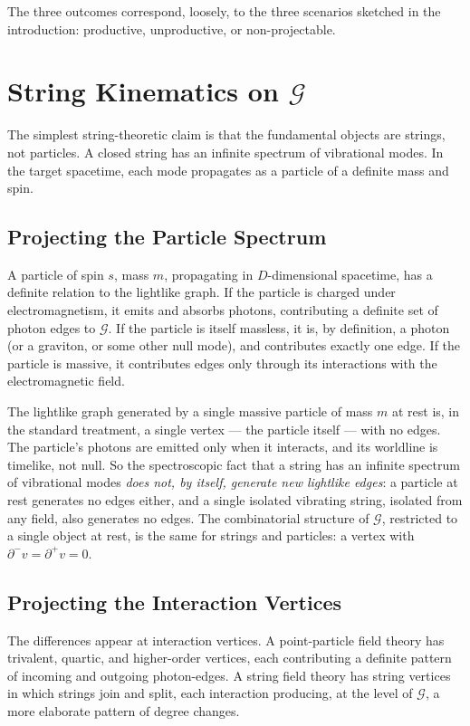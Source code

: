 \documentclass[11pt]{article}
\begin{document}
The three outcomes correspond, loosely, to the three scenarios sketched in the introduction: productive, unproductive, or non-projectable.

\section{String Kinematics on $\mathcal{G}$}

The simplest string-theoretic claim is that the fundamental objects are strings, not particles. A closed string has an infinite spectrum of vibrational modes. In the target spacetime, each mode propagates as a particle of a definite mass and spin.

\subsection{Projecting the Particle Spectrum}

A particle of spin $s$, mass $m$, propagating in $D$-dimensional spacetime, has a definite relation to the lightlike graph. If the particle is charged under electromagnetism, it emits and absorbs photons, contributing a definite set of photon edges to $\mathcal{G}$. If the particle is itself massless, it is, by definition, a photon (or a graviton, or some other null mode), and contributes exactly one edge. If the particle is massive, it contributes edges only through its interactions with the electromagnetic field.

The lightlike graph generated by a single massive particle of mass $m$ at rest is, in the standard treatment, a single vertex --- the particle itself --- with no edges. The particle's photons are emitted only when it interacts, and its worldline is timelike, not null. So the spectroscopic fact that a string has an infinite spectrum of vibrational modes \emph{does not, by itself, generate new lightlike edges}: a particle at rest generates no edges either, and a single isolated vibrating string, isolated from any field, also generates no edges. The combinatorial structure of $\mathcal{G}$, restricted to a single object at rest, is the same for strings and particles: a vertex with $\partial^- v = \partial^+ v = 0$.

\subsection{Projecting the Interaction Vertices}

The differences appear at interaction vertices. A point-particle field theory has trivalent, quartic, and higher-order vertices, each contributing a definite pattern of incoming and outgoing photon-edges. A string field theory has string vertices in which strings join and split, each interaction producing, at the level of $\mathcal{G}$, a more elaborate pattern of degree changes.
\end{document}
